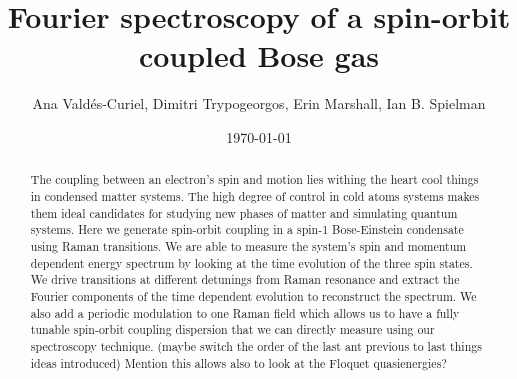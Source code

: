\documentclass{iopart}
\begin{document}
		
\title{Fourier spectroscopy of a spin-orbit coupled Bose gas}
	
\author{Ana Vald\'es-Curiel, Dimitri Trypogeorgos, Erin Marshall, Ian B. Spielman}
\address{Joint Quantum Institute, University of Maryland and National Institute of Standards and Technology, College Park, Maryland, 20742, USA}
\date{\today}

\begin{abstract}
	
	The coupling between an electron's spin and motion lies withing the heart cool things in condensed matter systems. The high degree of control in cold atoms systems makes them ideal candidates for studying new phases of matter and simulating quantum systems. Here we generate spin-orbit coupling in a spin-1 Bose-Einstein condensate using Raman transitions. We are able to measure the system's spin and momentum dependent energy spectrum by looking at the time evolution of the three spin states. We drive transitions at different detunings from Raman resonance and extract the Fourier components of the time dependent evolution to reconstruct the spectrum. We also add a periodic modulation to one Raman field which allows us to have a fully tunable spin-orbit coupling dispersion that we can directly measure using our spectroscopy technique. (maybe switch the order of the last ant previous to last things ideas introduced)
	Mention this allows also to look at the Floquet quasienergies?
\end{abstract}

\maketitle
\tableofcontents











%



\end{document}
